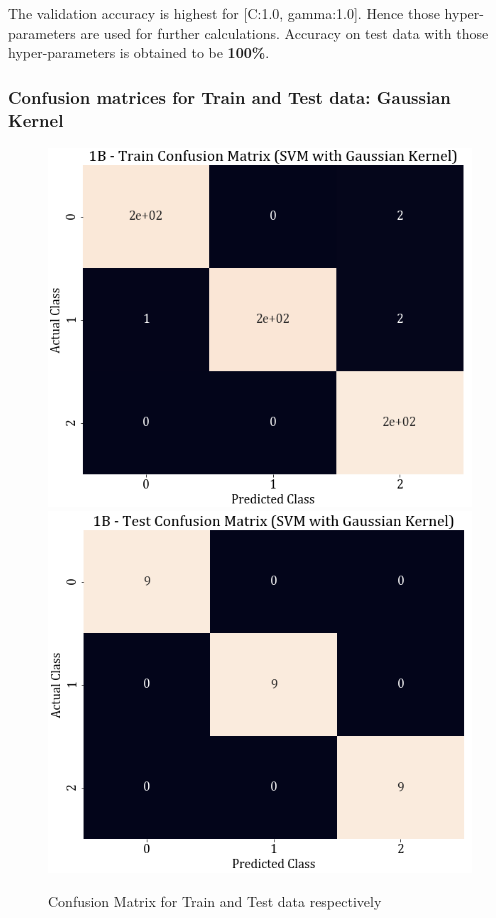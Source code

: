 \documentclass[11pt,a4paper]{article}
\newcommand{\noi}{\noindent}
\begin{document}
\noi
The validation accuracy is highest for [C:1.0, gamma:1.0]. Hence those hyper-parameters are used for further calculations. Accuracy on test data with those hyper-parameters is obtained to be \textbf{100\%}. 

\subsubsection{Confusion matrices for Train and Test data: Gaussian Kernel}

\begin{figure}[H]
    \centering
    \includegraphics[scale=0.4]{images/1B_SVM_gauss_train_confmat.png}
    \includegraphics[scale=0.4]{images/1B_SVM_gauss_Test_confmat.png}
    \caption{Confusion Matrix for Train and Test data respectively}
\end{figure}
\end{document}
